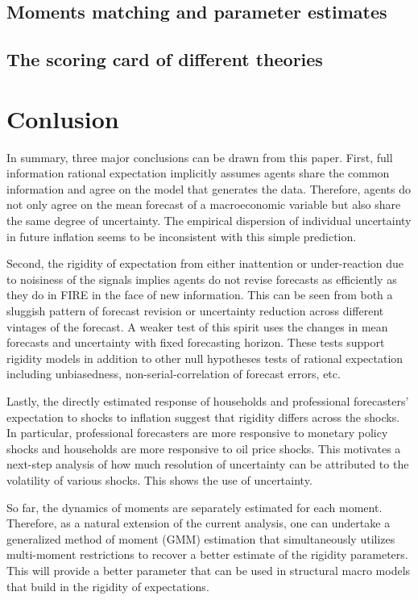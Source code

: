 \documentclass[12pt]{article}
\begin{document}
\subsection{Moments matching and parameter estimates}

\subsection{The scoring card of different theories}

\section{Conlusion}	
	In summary, three major conclusions can be drawn from this paper.  First, full information rational expectation implicitly assumes agents share the common information and agree on the model that generates the data. Therefore, agents do not only agree on the mean forecast of a macroeconomic variable but also share the same degree of uncertainty. The empirical dispersion of individual uncertainty in future inflation seems to be inconsistent with this simple prediction. 
	
	Second, the rigidity of expectation from either inattention or under-reaction due to noisiness of the signals implies agents do not revise forecasts as efficiently as they do in FIRE in the face of new information. This can be seen from both a sluggish pattern of forecast revision or uncertainty reduction across different vintages of the forecast. A weaker test of this spirit uses the changes in mean forecasts and uncertainty with fixed forecasting horizon. These tests support rigidity models in addition to other null hypotheses tests of rational expectation including unbiasedness,  non-serial-correlation of forecast errors, etc.
	
	Lastly, the directly estimated response of households and professional forecasters' expectation to shocks to inflation suggest that rigidity differs across the shocks. In particular, professional forecasters are more responsive to monetary policy shocks and households are more responsive to oil price shocks. This motivates a next-step analysis of how much resolution of uncertainty can be attributed to the volatility of various shocks. This shows the use of uncertainty.
	
	So far, the dynamics of moments are separately estimated for each moment. Therefore, as a natural extension of the current analysis, one can undertake a generalized method of moment (GMM) estimation that simultaneously utilizes multi-moment restrictions to recover a better estimate of the rigidity parameters.  This will provide a better parameter that can be used in structural macro models that build in the rigidity of expectations. 
	
	
	
	
\end{document}
